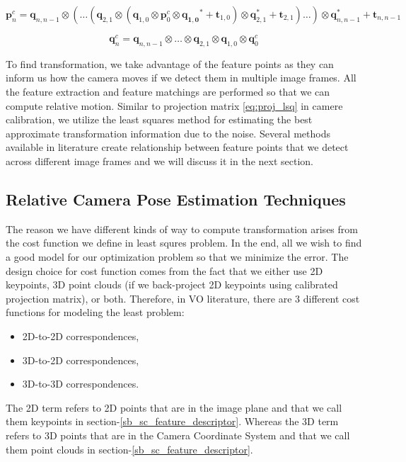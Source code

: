 \documentclass[a4paper]{report}
\numberwithin{figure}{section}
\begin{document}
\begin{equation}
  \mathbf{p}_{n}^c = 
  \mathbf{q}_{n, n-1} \otimes (\dots
  (\mathbf{q}_{2,1} \otimes
  (\mathbf{q}_{1,0} \otimes \mathbf{p}_0^c \otimes \mathbf{q_{1,0}}^* + \mathbf{t}_{1,0})
  \otimes \mathbf{q}_{2,1}^* + \mathbf{t}_{2,1})
  \dots) \otimes \mathbf{q}_{n, n-1}^* +\mathbf{t}_{n, n-1} 
\end{equation}

\begin{equation}
  \mathbf{q}_{n}^c = 
  \mathbf{q}_{n,n-1} \otimes \dots \otimes \mathbf{q}_{2,1} \otimes \mathbf{q}_{1,0} \otimes \mathbf{q}_{0}^c 
\end{equation}

To find transformation, we take advantage of the feature points as they can 
inform us how the camera moves if we detect them in multiple image frames.
All the feature extraction and feature matchings are performed so that we 
can compute relative motion.
Similar to projection matrix \ref{eq:proj_lsq} in camere calibration, we utilize 
the least squares method for estimating the best approximate transformation information
due to the noise. Several methods available in literature create 
relationship between feature points that we detect across different image frames and 
we will discuss it in the next section.

\subsection{Relative Camera Pose Estimation Techniques}
\label{sb_sc_relative_camera_pose_estimation_techniques}

The reason we have different kinds of way to compute transformation arises from 
the cost function we define in least squres problem. In the end, all we wish to 
find a good model for our optimization problem so that we minimize the error.
The design choice for cost function comes from the fact that we either use 
2D keypoints, 3D point clouds (if we back-project 2D keypoints using 
calibrated projection matrix), or both.
Therefore, in VO literature, 
there are 3 different cost functions for modeling the least problem:
\begin{itemize}
  \item 2D-to-2D correspondences,
  \item 3D-to-2D correspondences,
  \item 3D-to-3D correspondences.
\end{itemize}
The 2D term refers to 2D points that are in the image plane and that we call 
them keypoints in section-\ref{sb_sc_feature_descriptor}. 
Whereas the 3D term refers to 3D points that are in the Camera Coordinate 
System and that we call them point clouds in section-\ref{sb_sc_feature_descriptor}.
\end{document}
